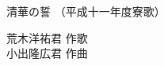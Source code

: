\documentclass[10pt,b5j]{tarticle} %
\begin{document}
\begin{minipage}[c]{0.7\hsize} %
    \begin{center}
        {\LARGE
            清華の誓 %
        }
        {\small 
            （平成十一年度寮歌） %
        }
    \end{center}
\end{minipage}
\begin{minipage}[c]{0.3\hsize} %
    \begin{flushright} %
        荒木洋祐君 作歌\\小出隆広君 作曲 %
    \end{flushright}
\end{minipage}
\end{document}
